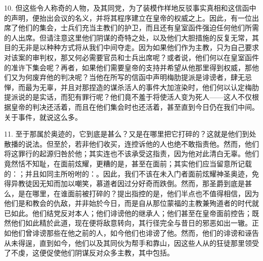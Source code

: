 10. 但这些令人称奇的人物，及其同党，为了装模作样地反驳事实真相和这信函中的声明，便抬出会议的名义，并将其程序建立在皇帝的权威之上。因此，有一位出席了他们的集会，士兵们充当主教们的护卫，而且还有皇室函件强迫任何他们所需的人出席。但请注意这里他们阴谋的奇特之处，以及他们大胆措施的反复无常，其目的无非是以种种方式将从我们中间夺走。因为如果他们作为主教，只为自己要求对该案的审判权，那又何必需要官员和士兵出席呢？或者说，他们何以在皇室函件的准许下集会呢？再者，如果他们需要皇帝的支持并希望从他那里得到权威，那他们又为何废弃他的判决呢？当他在所写的信函中声明梅肋提派是诽谤者，肆无忌惮，而最为无辜，并且对那捏造的谋杀活人的事件大加渲染时，他们何以认定梅肋提派说的是实话，而犯有罪行呢？他们竟不羞于将使活人变为死人——这人不仅根据皇帝的判决还活着，而且在他们集会时也还活着，甚至直到今日仍在我们中间。关于事件，就说这么多。\par

11. 至于那属於奥迹的，它到底是甚么？又是在哪里把它打碎的？这就是他们到处散播的说法。但至於，若非他们收买，连控诉他的人也绝不敢指责他。然而，他们将这罪行的起源归咎於他；其实连也不该承受这指责，因为他对此清白无辜。他们竟然恬不知耻，在面前炫耀，更糟的是，甚至在面前；其实他们应当留意所记载的：；并且如同主所吩咐的：。因此，我们不该在未入门者面前炫耀神圣奥迹，免得异教徒因无知而加以嘲笑，慕道者因过分好奇而跌倒。然而，那圣爵到底是甚么，是在哪里，在谁面前被打碎的？提出指控的是，他们半点也不值得相信，因为他们是和教会的仇敌，并非始於今日，而是自从那位蒙福的主教兼殉道者的时代就已如此。他们结党反对本人；他们诽谤他的继承人；他们甚至在皇帝面前控告；既然他们如此精於此道，现在便将敌意转向，其行径完全与昔日的邪恶如出一辙。正如他们曾诽谤那些在他之前的人，如今他们也诽谤了他。然而，他们的诽谤和诬告从未得逞，直到如今，他们以及其同伙为帮手和靠山，因这些人从的狂徒那里领受了不虔，这便促使他们阴谋反对众多主教，其中包括。\par

